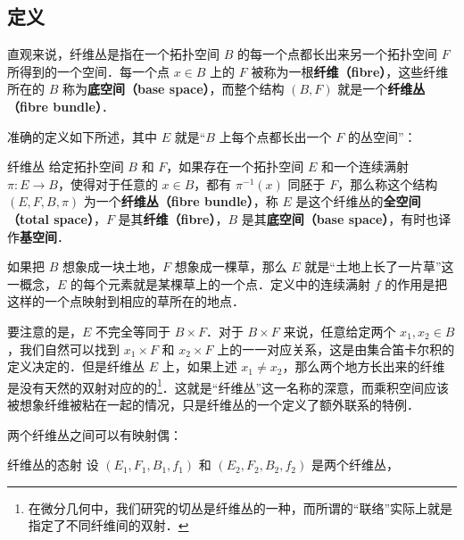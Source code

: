 
\begin{issues}
\issueDraft
\end{issues}


\subsection{定义}

直观来说，纤维丛是指在一个拓扑空间 $B$ 的每一个点都长出来另一个拓扑空间 $F$ 所得到的一个空间．每一个点 $x\in B$ 上的 $F$ 被称为一根\textbf{纤维（fibre）}，这些纤维所在的 $B$ 称为\textbf{底空间（base space）}，而整个结构 $(B, F)$ 就是一个\textbf{纤维丛（fibre bundle）}．

准确的定义如下所述，其中 $E$ 就是“$B$ 上每个点都长出一个 $F$ 的丛空间”：

\begin{definition}{纤维丛}
给定拓扑空间 $B$ 和 $F$，如果存在一个拓扑空间 $E$ 和一个连续满射 $\pi:E\rightarrow B$，使得对于任意的 $x\in B$，都有 $\pi^{-1}(x)$ 同胚于 $F$，那么称这个结构 $(E, F, B, \pi)$ 为一个\textbf{纤维丛（fibre bundle）}，称 $E$ 是这个纤维丛的\textbf{全空间（total space）}，$F$ 是其\textbf{纤维（fibre）}，$B$ 是其\textbf{底空间（base space）}，有时也译作\textbf{基空间}．
\end{definition}

如果把 $B$ 想象成一块土地，$F$ 想象成一棵草，那么 $E$ 就是“土地上长了一片草”这一概念，$E$ 的每个元素就是某棵草上的一个点．定义中的连续满射 $f$ 的作用是把这样的一个点映射到相应的草所在的地点．

要注意的是，$E$ 不完全等同于 $B\times F$．对于 $B\times F$ 来说，任意给定两个 $x_1, x_2\in B$，我们自然可以找到 $x_1\times F$ 和 $x_2\times F$ 上的一一对应关系，这是由集合笛卡尔积的定义决定的．但是纤维丛 $E$ 上，如果上述 $x_1\not=x_2$，那么两个地方长出来的纤维是没有天然的双射对应的的\footnote{在微分几何中，我们研究的切丛是纤维丛的一种，而所谓的“联络”实际上就是指定了不同纤维间的双射．}．这就是“纤维丛”这一名称的深意，而乘积空间应该被想象纤维被粘在一起的情况，只是纤维丛的一个定义了额外联系的特例．

两个纤维丛之间可以有映射偶：

\begin{definition}{纤维丛的态射}
设 $(E_1, F_1, B_1, f_1)$ 和 $(E_2, F_2, B_2, f_2)$ 是两个纤维丛，
\end{definition}

